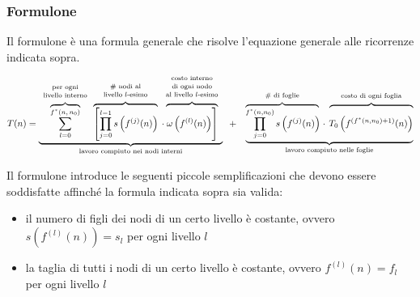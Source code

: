 \subsubsection*{Formulone}
Il formulone è una formula generale che risolve l'equazione generale alle ricorrenze indicata sopra.
\[
T(n) = \underbrace{
	\overbrace{\sum_{l=0}^{f^* (n, \, n_0)}}^{\begin{array}{c} \text{\scriptsize per ogni} \\[-3pt] \text{\scriptsize livello interno} \end{array}}
	\overbrace{\left[ \prod_{j=0}^{l-1} s \left(f^{(j)}(n) \right) \right. \!}^{\begin{array}{c} \text{\scriptsize \# nodi al} \\[-3pt] \text{\scriptsize livello \(l\)-esimo} \end{array}}
	\; \cdot \!\!\! \overbrace{\left. \phantom{\prod_{j}^{l} \!\!\!\!\!\!\!\!} \omega \left( f^{(l)}(n) \right) \right]}^{\begin{array}{c} \text{\scriptsize costo interno} \\[-3pt] \text{\scriptsize di ogni nodo} \\[-3pt] \text{\scriptsize al livello \(l\)-esimo} \end{array}}
	}_\text{lavoro compiuto nei nodi interni}
	\;\; + \;\;\;
	\underbrace{ \overbrace{\prod_{j=0}^{f^*(n, n_0)} s \left(f^{(j)}(n) \right) \!}^{\begin{array}{c} \text{\scriptsize \# di foglie} \end{array}}
	\; \cdot \; \overbrace{ \phantom{\prod_{j}^{f^*} \!\!\!\!\!\!\!\!} T_0 \left( f^{(f^*(n, n_0) + 1)}(n) \right)}^{\begin{array}{c} \text{\scriptsize costo di ogni foglia}\end{array}}
	}_\text{lavoro compiuto nelle foglie}
\]

\vspace{7pt}

\noindent
Il formulone introduce le seguenti piccole semplificazioni che devono essere soddisfatte affinché la formula
indicata sopra sia valida:
\begin{itemize}
	\item il numero di figli dei nodi di un certo livello è costante, ovvero \(s(f^{(l)}(n)) = s_l\) per ogni livello \(l\)
	\item la taglia di tutti i nodi di un certo livello è costante, ovvero \(f^{(l)}(n) = f_l\) per ogni livello \(l\)
\end{itemize}

